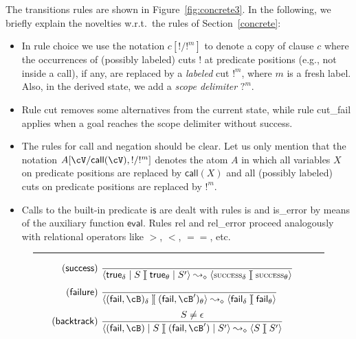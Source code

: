 \documentclass[fleqn]{tlp}
\newcommand{\call}{\mathsf{call}}
\newcommand{\fail}{\mathsf{fail}}
\newcommand{\eval}{\mathsf{eval}}
\newcommand{\sep}{\mathit{\;]\![\;}}
\newcommand{\success}{\mbox{\footnotesize \textsc{success}}}
\def \tuple#1{\langle #1 \rangle}
\begin{document}
\begin{appendix}
The transitions rules are shown in Figure~\ref{fig:concrete3}. In the
following, we briefly explain the novelties w.r.t.\ the rules of
Section~\ref{concrete}: 
\begin{itemize}
\item In rule \textsf{choice} we use the notation $c[!/!^m]$ to denote
  a copy of clause $c$ where the occurrences of (possibly labeled)
  cuts $!$ at predicate positions (e.g., not inside a \textsf{call}),
  if any, are replaced by a \emph{labeled} cut $!^m$, where $m$ is a
  fresh label.  Also, in the derived state, we add a \emph{scope
    delimiter} $?^m$.  

\item Rule \textsf{cut} removes some alternatives from the current
  state, while rule \textsf{cut\_fail} applies when a goal reaches the
  scope delimiter without success.

\item The rules for \textsf{call} and negation should be clear. Let us
  only mention that the notation $A[\cV/\textsf{call}(\cV),!/!^m]$
  denotes the atom $A$ in which all variables $X$ on predicate
  positions are replaced by $\call(X)$ and all (possibly labeled) cuts
  on predicate positions are replaced by $!^m$.

\item Calls to the built-in predicate $\mathsf{is}$ are dealt with
  rules \textsf{is} and \textsf{is\_error} by means of the auxiliary
  function $\eval$. Rules \textsf{rel} and \textsf{rel\_error} proceed
  analogously with relational operators like $>$, $<$, $==$, etc.
\end{itemize} 


\begin{figure}[b]
  \footnotesize
  \rule{\linewidth}{1pt}
  \[
  \hspace{-3ex}\begin{array}{r@{~}l}
    \mathsf{(success)} & {\displaystyle 
      \frac{~} 
        {\tuple{\mathsf{true}_\delta\mid S
            \sep\mathsf{true}_{\theta}\mid S'} 
          \leadsto_\diamond
          \tuple{\success_\delta \sep \success_\theta}}
        } \\[3ex]

    \mathsf{(failure)} & {\displaystyle 
      \frac{~} 
        {\tuple{(\mathsf{fail},\cB)_\delta
          \sep (\mathsf{fail},\cB')_\theta} \leadsto_\diamond 
        \tuple{\fail_\delta \sep \fail_\theta}}
        }\\[3ex]

    \mathsf{(backtrack)} & {\displaystyle 
      \frac{S\neq\epsilon} 
        {\tuple{(\mathsf{fail},\cB)\mid S \sep
          (\mathsf{fail},\cB')\mid S'} \leadsto_\diamond \tuple{S\sep S'}}
        }\\[3ex]


\end{array}\]
\end{figure}
\end{appendix}
\end{document}
